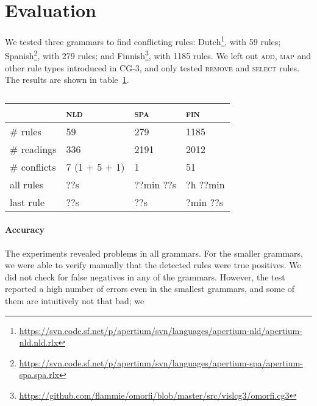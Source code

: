 \section{Evaluation}
\label{sec:eval}

We tested three grammars to find conflicting rules: 
Dutch\footnote{\url{https://svn.code.sf.net/p/apertium/svn/languages/apertium-nld/apertium-nld.nld.rlx}},
with 59 rules; 
Spanish\footnote{\url{https://svn.code.sf.net/p/apertium/svn/languages/apertium-spa/apertium-spa.spa.rlx}},
with 279 rules; and 
Finnish\footnote{\url{https://github.com/flammie/omorfi/blob/master/src/vislcg3/omorfi.cg3}},
with 1185 rules. We left out \textsc{add}, \textsc{map} and other rule
types introduced in CG-3, and only tested \textsc{remove} and \textsc{select} rules.
The results are shown in table~\ref{table:res}. 


\begin{table}[]
\centering
\begin{tabular}{|l|l|l|l|}

\hline
              & \textsc{nld}  & \textsc{spa}  & \textsc{fin}  \\ \hline
\# rules      & 59              & 279      & 1185     \\ \hline
\# readings   & 336             & 2191     & 2012    \\ \hline
\# conflicts  & 7 (1 + 5 + 1)   & 1        & 51    \\ \hline
\clock{} all rules       & ??s              & ??min ??s    & ?h ??min    \\ \hline
\clock{} last rule       & ??s              & ??s          & ?min ??s    \\ \hline


\end{tabular}
\caption{}
\label{table:res}
\end{table}

\paragraph{Accuracy} 
The experiments revealed problems in all grammars. For the smaller
grammars, we were able to verify manually that the detected rules were
true positives.
We did not check for false negatives in any of the grammars. However, the test reported a high number of errors even in the smallest grammars, and some of them are intuitively not that bad; we 


